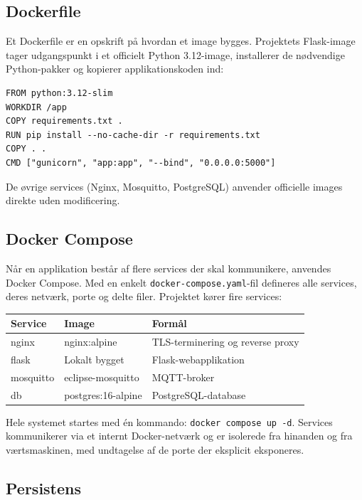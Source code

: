 \documentclass[a4paper,12pt]{article}
\begin{document}
\subsection{Dockerfile}

Et Dockerfile er en opskrift på hvordan et image bygges. Projektets Flask-image tager udgangspunkt i et officielt Python 3.12-image, installerer de nødvendige Python-pakker og kopierer applikationskoden ind:

\begin{lstlisting}
FROM python:3.12-slim
WORKDIR /app
COPY requirements.txt .
RUN pip install --no-cache-dir -r requirements.txt
COPY . .
CMD ["gunicorn", "app:app", "--bind", "0.0.0.0:5000"]
\end{lstlisting}

De øvrige services (Nginx, Mosquitto, PostgreSQL) anvender officielle images direkte uden modificering.

\subsection{Docker Compose}

Når en applikation består af flere services der skal kommunikere, anvendes Docker Compose. Med en enkelt \texttt{docker-compose.yaml}-fil defineres alle services, deres netværk, porte og delte filer. Projektet kører fire services:

\begin{center}
\begin{tabular}{lll}
\toprule
\textbf{Service} & \textbf{Image} & \textbf{Formål} \\
\midrule
nginx      & nginx:alpine          & TLS-terminering og reverse proxy \\
flask      & Lokalt bygget         & Flask-webapplikation \\
mosquitto  & eclipse-mosquitto     & MQTT-broker \\
db         & postgres:16-alpine    & PostgreSQL-database \\
\bottomrule
\end{tabular}
\end{center}

Hele systemet startes med én kommando: \texttt{docker compose up -d}. Services kommunikerer via et internt Docker-netværk og er isolerede fra hinanden og fra værtsmaskinen, med undtagelse af de porte der eksplicit eksponeres.

\subsection{Persistens}
\end{document}
